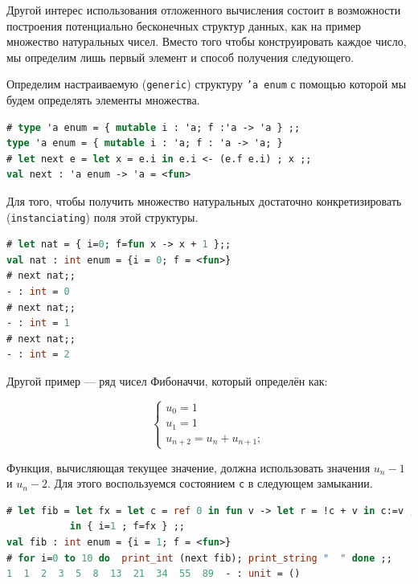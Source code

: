 Другой интерес использования отложенного вычисления состоит в возможности
построения потенциально бесконечных структур данных, как на пример множество
натуральных чисел. Вместо того чтобы конструировать каждое число, мы определим
лишь первый элемент и способ получения следующего.

Определим настраиваемую (\texttt{generic}) структуру \texttt{'a enum} с помощью
которой мы будем определять элементы множества.

\label{subsubsec:infinite_data_structures}

\begin{lstlisting}[language=OCaml]
# type 'a enum = { mutable i : 'a; f :'a -> 'a } ;;
type 'a enum = { mutable i : 'a; f : 'a -> 'a; }
# let next e = let x = e.i in e.i <- (e.f e.i) ; x ;;
val next : 'a enum -> 'a = <fun>
\end{lstlisting}

Для того, чтобы получить множество натуральных достаточно конкретизировать
(\texttt{instanciating}) поля этой структуры.

\begin{lstlisting}[language=OCaml]
# let nat = { i=0; f=fun x -> x + 1 };;
val nat : int enum = {i = 0; f = <fun>}
# next nat;;
- : int = 0
# next nat;;
- : int = 1
# next nat;;
- : int = 2
\end{lstlisting}

Другой пример --- ряд чисел Фибоначчи, который определён как:

$$
\begin{cases}
	u_0 = 1 \\
	u_1 = 1 \\
	u_{n + 2} = u_{n} + u_{n+1};
\end{cases}
$$

Функция, вычисляющая текущее значение, должна использовать значения $u_n - 1$ и
$u_n - 2$. Для этого воспользуемся состоянием \texttt{c} в следующем замыкании.

\begin{lstlisting}[language=OCaml]
# let fib = let fx = let c = ref 0 in fun v -> let r = !c + v in c:=v ; r
           in { i=1 ; f=fx } ;;
val fib : int enum = {i = 1; f = <fun>}
# for i=0 to 10 do  print_int (next fib); print_string "  " done ;;
1  1  2  3  5  8  13  21  34  55  89  - : unit = ()
\end{lstlisting}